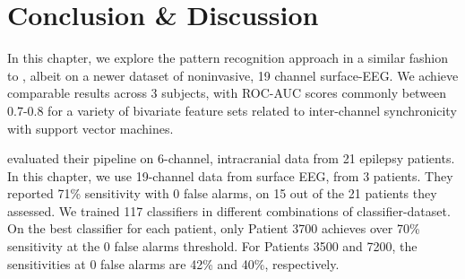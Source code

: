 \begin{figure}[htp]

    

    
    
    
\end{figure}


\section{Conclusion \& Discussion}

In this chapter, we explore the pattern recognition approach in a similar fashion to \citet{mirowski2009classification}, albeit on a newer dataset of noninvasive, 19 channel surface-EEG. We achieve comparable results across 3 subjects, with ROC-AUC scores commonly between 0.7-0.8 for a variety of bivariate feature sets related to inter-channel synchronicity with support vector machines.


 evaluated their pipeline on 6-channel, intracranial data from 21 epilepsy patients. In this chapter, we use 19-channel data from surface EEG, from 3 patients. They reported 71\% sensitivity with 0 false alarms, on 15 out of the 21 patients they assessed. We trained 117 classifiers in different combinations of classifier-dataset. On the best classifier for each patient, only Patient 3700 achieves over 70\% sensitivity at the 0 false alarms threshold. For Patients 3500 and 7200, the sensitivities at 0 false alarms are 42\% and 40\%, respectively.

